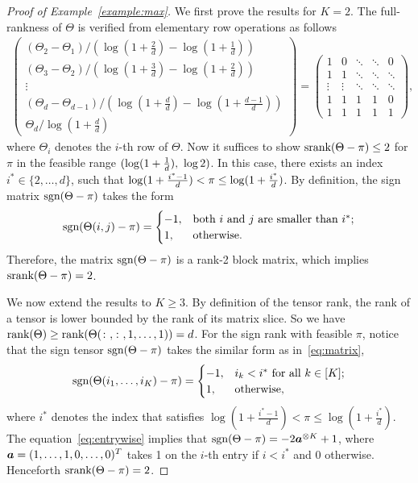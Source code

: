 \documentclass[11pt]{article}
\theoremstyle{plain}
\theoremstyle{definition}
\def\sign{\textup{sgn}}
\def\srank{\textup{srank}}
\def\rank{\textup{rank}}
\begin{document}
\begin{proof}[Proof of Example~\ref{example:max}]
We first prove the results for $K=2$. The full-rankness of $\Theta$ is verified from elementary row operations as follows
\begin{align}
\begin{pmatrix}
(\Theta_2-\Theta_1)/(\log(1+\frac{2}{d})-\log(1+\frac{1}{d}))\\(\Theta_3-\Theta_2)/(\log(1+\frac{3}{d})-\log(1+\frac{2}{d}))\\\vdots\\ (\Theta_d-\Theta_{d-1})/(\log(1+\frac{d}{d})-\log(1+\frac{d-1}{d}))\\\Theta_d/\log(1+\frac{d}{d})
\end{pmatrix} = \begin{pmatrix}
 1&          0  &      \ddots  &        \ddots       &          0 \\
1& 1 & \ddots &            \ddots   &   \ddots          \\
      \vdots &     \vdots & \ddots &       \ddots &    \ddots         \\
 1 & 1 &1 & 1 &0\\
 1 & 1 &1 & 1 &1
\end{pmatrix},
\end{align}
where $\Theta_i$ denotes the $i$-th row of $\Theta$. 
Now it suffices to show $\srank(\Theta-\pi)\leq 2$ for $\pi$ in the feasible range $(\log(1+{1\over d}),\ \log 2)$. In this case, there exists an index $i^*\in\{2,\ldots,d\}$, such that $\log(1+{i^*-1\over d})< \pi\leq \log(1+{i^*\over d})$. By definition, the sign matrix $\sign (\Theta-\pi)$ takes the form
\begin{equation}\label{eq:matrix}
\sign (\Theta(i,j)-\pi)=
\begin{cases}
-1, & \text{both $i$ and $j$ are smaller than $i^*$};\\
1, & \text{otherwise}.
\end{cases}
\end{equation}
Therefore, the matrix $\sign (\Theta-\pi)$ is a rank-2 block matrix, which implies $\srank(\Theta-\pi)=2$. 

We now extend the results to $K\geq 3$. By definition of the tensor rank, the rank of a tensor is lower bounded by the rank of its matrix slice.  So we have $\rank(\Theta)\geq \rank(\Theta(\colon,\colon,1,\ldots,1))=d$. For the sign rank with feasible $\pi$, notice that the sign tensor $\sign(\Theta-\pi)$ takes the similar form as in~\eqref{eq:matrix},
\begin{equation}\label{eq:entrywise}
\sign (\Theta(i_1,\ldots,i_K)-\pi)=
\begin{cases}
-1, & \text{$i_k<i^*$ for all $k\in[K]$};\\
1, & \text{otherwise},
\end{cases}
\end{equation}
where $i^*$ denotes the index that satisfies $\log(1+\frac{i^*-1}{d})<\pi\leq \log(1+\frac{i^*}{d})$.
The equation~\eqref{eq:entrywise} implies that $\sign(\Theta-\pi)=-2\ma^{\otimes K}+1$, where $\bm{a}=(1,\ldots,1,0,\ldots,0)^T$ takes 1 on the $i$-th entry if $i<i^*$ and 0 otherwise. Henceforth $\srank(\Theta-\pi)=2$. 
\end{proof}
\end{document}
